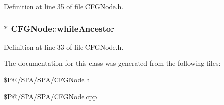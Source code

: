 Definition at line 35 of file C\-F\-G\-Node.\-h.

\hypertarget{class_c_f_g_node_ade810133e14d7229080fae4b61c4c996}{
\subsubsection[{while\-Ancestor}]{$\ast$ C\-F\-G\-Node\-::while\-Ancestor}}\label{class_c_f_g_node_ade810133e14d7229080fae4b61c4c996}


Definition at line 33 of file C\-F\-G\-Node.\-h.



The documentation for this class was generated from the following files\-:\begin{DoxyCompactItemize}
\item 
\$\-P@/\-S\-P\-A/\-S\-P\-A/\hyperlink{_c_f_g_node_8h}{C\-F\-G\-Node.\-h}\item 
\$\-P@/\-S\-P\-A/\-S\-P\-A/\hyperlink{_c_f_g_node_8cpp}{C\-F\-G\-Node.\-cpp}\end{DoxyCompactItemize}
